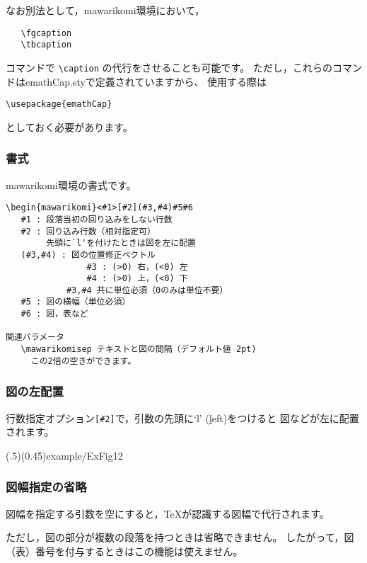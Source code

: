 \documentclass[fleqn,a4j]{jarticle}
\begin{document}
なお別法として，\textsf{mawarikomi}環境において，
\begin{verbatim}
   \fgcaption
   \tbcaption
\end{verbatim}
コマンドで \verb/\caption/ の代行をさせることも可能です。
ただし，これらのコマンドは\textsf{emathCap.sty}で定義されていますから、
使用する際は
\begin{jquote}
\begin{verbatim}
\usepackage{emathCap}
\end{verbatim}
\end{jquote}
としておく必要があります。

\subsubsection{書式}
\textsf{mawarikomi}環境の書式です。

\begin{boxnote}
\begin{verbatim}
\begin{mawarikomi}<#1>[#2](#3,#4)#5#6
   #1 : 段落当初の回り込みをしない行数
   #2 : 回り込み行数（相対指定可）
        先頭に`l'を付けたときは図を左に配置
   (#3,#4) : 図の位置修正ベクトル
                #3 : (>0) 右，(<0) 左
                #4 : (>0) 上，(<0) 下
            #3,#4 共に単位必須（0のみは単位不要）
   #5 : 図の横幅（単位必須）
   #6 : 図，表など

関連パラメータ
   \mawarikomisep テキストと図の間隔（デフォルト値 2pt)
     この2倍の空きができます。
\end{verbatim}
\end{boxnote}

\subsubsection{図の左配置}
行数指定オプション\verb/[#2]/で，引数の先頭に`l' (\underline{l}eft)をつけると
図などが左に配置されます。

\showexample[図の左配置](.5)(0.45){example/ExFig12}

\subsubsection{図幅指定の省略}
図幅を指定する引数を空にすると，\TeX が認識する図幅で代行されます。

ただし，図の部分が複数の段落を持つときは省略できません。
したがって，図（表）番号を付与するときはこの機能は使えません。
\end{document}
